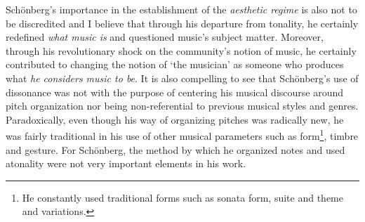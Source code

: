 Sch\"{o}nberg's importance in the establishment of the \emph{aesthetic regime} is also not to be discredited and I believe that through his departure from tonality, he certainly redefined \emph{what music is} and questioned music's subject matter. Moreover, through his revolutionary shock on the community's notion of music, he certainly contributed to changing the notion of `the musician' as someone who produces what \emph{he considers music to be}. It is also compelling to see that Sch\"{o}nberg's use of dissonance was not with the purpose of centering his musical discourse around pitch organization nor being non-referential to previous musical styles and genres. Paradoxically, even though his way of organizing pitches was radically new, he was fairly traditional in his use of other musical parameters such as form\footnote{He constantly used traditional forms such as sonata form, suite and theme and variations.}, timbre and gesture. For Sch\"{o}nberg, the method by which he organized notes and used atonality were not very important elements in his work.

